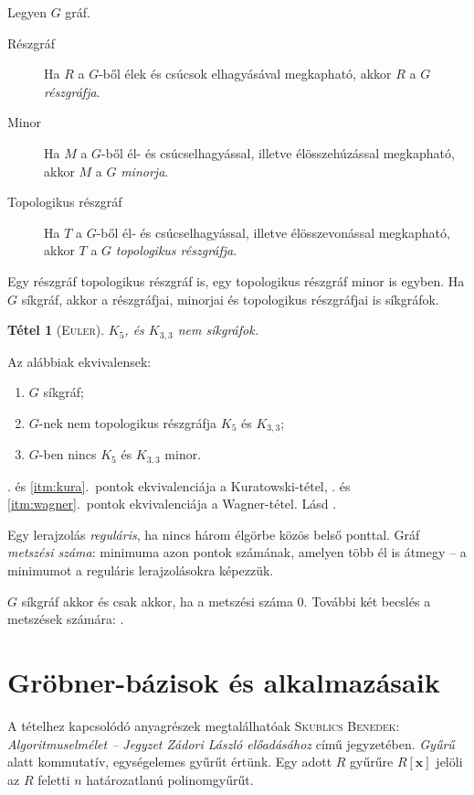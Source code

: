 \documentclass[DIV=15,appendixprefix]{scrreprt}
\newtheorem*{tetel}{Tétel}
\theoremstyle{definition}
\theoremstyle{remark}
\begin{document}
Legyen $ G $ gráf.
\begin{description}
	\item[Részgráf] Ha $R$ a $G$-ből élek és csúcsok elhagyásával megkapható, akkor $R$ a $G$
		\emph{részgráfja}.
	\item[Minor] Ha $M$ a $G$-ből él- és csúcselhagyással, illetve élösszehúzással megkapható, akkor
		$M$ a $G$ \emph{minorja}.
	\item[Topologikus részgráf] Ha $T$ a $G$-ből él- és csúcselhagyással, illetve élösszevonással
		megkapható, akkor $T$ a $G$ \emph{topologikus részgráfja}.
\end{description}
Egy részgráf topologikus részgráf is, egy topologikus részgráf minor is egyben. Ha $G$ síkgráf,
akkor a részgráfjai, minorjai és topologikus részgráfjai is síkgráfok.
\begin{tetel}[\textsc{Euler}]
	$ K_5 $, és $K_{3,{}3}$ nem síkgráfok.
\end{tetel}
%
Az alábbiak ekvivalensek:
\begin{enumerate}
	\item\label{itm:sik} $G$ síkgráf;
	\item\label{itm:kura} $G$-nek nem topologikus részgráfja $K_{5}$ és $K_{3,{}3}$;
	\item\label{itm:wagner} $G$-ben nincs $K_{5}$ és $K_{3,{}3}$ minor.
\end{enumerate}
. és \ref{itm:kura}.~pontok ekvivalenciája a Kuratowski-tétel, . és
\ref{itm:wagner}.~pontok ekvivalenciája a Wagner-tétel.
%
Lásd
\cite[\href{http://www.math.u-szeged.hu/~hajnal/courses/MSc_Diszkret/MSc_kombi13/ea-xszam.pdf}
{\emph{Síkgráfok II. -- Metszési szám és alkalmazásai}}]{DiMat}.

Egy lerajzolás \emph{reguláris}, ha nincs három élgörbe közös belső ponttal. Gráf \emph{metszési
száma}: minimuma azon pontok számának, amelyen több él is átmegy -- a minimumot a reguláris
lerajzolásokra képezzük.

$G$ síkgráf akkor és csak akkor, ha a metszési száma 0. További két becslés a metszések számára:
\cite[\href{http://www.math.u-szeged.hu/~hajnal/courses/MSc_Diszkret/MSc_kombi13/ea-xszam.pdf}
{\emph{Síkgráfok II. -- Metszési szám és alkalmazásai}}, 4.~oldal]{DiMat}.
%
\section{Gröbner-bázisok és alkalmazásaik}
A tételhez kapcsolódó anyagrészek megtalálhatóak \textsc{Skublics Benedek}: \emph{Algoritmuselmélet
-- Jegyzet Zádori László előadásához} \cite{Zadori} című jegyzetében.
%
\emph{Gyűrű} alatt kommutatív, egységelemes gyűrűt értünk. Egy adott $ R $ gyűrűre $ R \left[
\mathbf{ x } \right] $ jelöli az $ R $ feletti $ n $ határozatlanú polinomgyűrűt.
\end{document}

